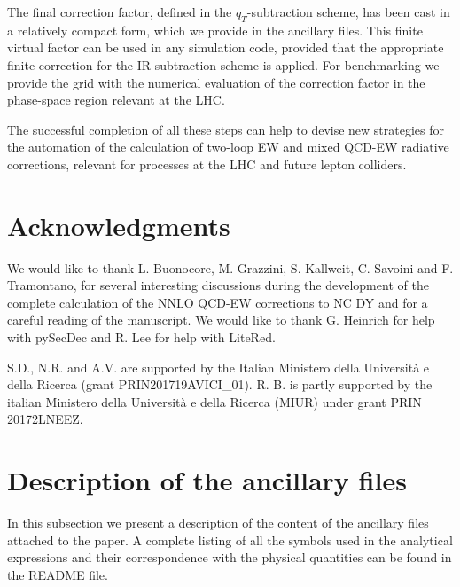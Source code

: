 \documentclass[11pt,a4paper]{article}
\begin{document}
The final correction factor, defined in the $q_T$-subtraction scheme,
has been cast in a relatively compact form,
which we provide in the ancillary files.
This finite virtual factor can be used in any simulation code,
provided that the appropriate finite correction for the IR subtraction scheme
is applied.
For benchmarking we provide the grid with the numerical evaluation
of the correction factor in the phase-space region relevant at the LHC.

The successful completion of all these steps can help to devise
new strategies for the automation of the calculation of two-loop
EW and mixed QCD-EW radiative corrections,
relevant for processes at the LHC and future lepton colliders.




\section*{Acknowledgments}
We would like to thank L. Buonocore, M. Grazzini, S. Kallweit, C. Savoini and F. Tramontano,
for several interesting discussions during the development of the complete
calculation of the NNLO QCD-EW corrections to NC DY and for a careful reading of the manuscript.
We would like to thank G. Heinrich for help with {\sc pySecDec}
and R. Lee for help with {\sc LiteRed}.

S.D., N.R. and A.V. are supported by the Italian Ministero della Universit\`a e della Ricerca (grant PRIN201719AVICI\_01).
R. B. is partly supported by the italian Ministero della Universit\`a e della Ricerca (MIUR) under grant PRIN 20172LNEEZ.




\appendix
\section{Description of the ancillary files}
\label{app:readme}
In this subsection we present a description of the content of
the ancillary files attached to the paper.
A complete listing of all the symbols used in the analytical expressions
and their correspondence with the physical quantities can be found in the
\textsf{README} file.
\end{document}
